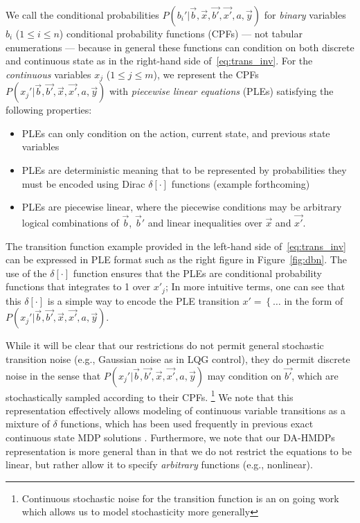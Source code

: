 \documentclass[twoside,11pt]{article}
\begin{document}
We call the conditional probabilities
$P(b_i'|\vec{b},\vec{x},\vec{b'},\vec{x'},a,\vec{y})$ for \emph{binary} variables $b_i$
($1 \leq i \leq n$) conditional probability functions (CPFs) --- not
tabular enumerations --- because in general these functions can
condition on both discrete and continuous state as
in the right-hand side of~\eqref{eq:trans_inv}.  For the \emph{continuous} variables
$x_j$ ($1 \leq j \leq m$), we represent the CPFs
$P(x_j'|\vec{b},\vec{b'},\vec{x},\vec{x'},a,\vec{y})$ with \emph{piecewise
linear equations} (PLEs) satisfying the following properties: 
\begin{itemize}
\item PLEs can only condition on the action, current state, and previous state variables
\item PLEs are deterministic meaning that to be represented by probabilities they
must be encoded using Dirac $\delta[\cdot]$ functions (example forthcoming)
\item PLEs are piecewise linear, where the piecewise conditions may be arbitrary logical combinations of $\vec{b}$, $\vec{b}'$ 
and linear inequalities over $\vec{x}$ and $\vec{x'}$.  
\end{itemize}

The transition function example provided in the left-hand side of~\eqref{eq:trans_inv} can be expressed in PLE format such as the right figure in Figure~\ref{fig:dbn}.
The use of the $\delta[\cdot]$ function ensures that the PLEs are conditional
probability functions that integrates to 1 over $x'_j$; In more intuitive
terms, one can see that this $\delta[\cdot]$ is a simple way to encode
the PLE transition $x' = \left\{ \ldots \right.$ in the form of 
$P(x_j'|\vec{b},\vec{b'},\vec{x},\vec{x'},a,\vec{y})$.

While it will be clear that our restrictions do not permit general stochastic transition noise (e.g., Gaussian noise as in LQG control), they do permit discrete noise in the sense that
$P(x_j'|\vec{b},\vec{b'},\vec{x},\vec{x'},a,\vec{y})$ may condition on
$\vec{b'}$, which are stochastically sampled according to their CPFs.
\footnote{Continuous stochastic noise for the transition function is an on going work which allows us to model stochasticity more generally}
We note that this representation effectively allows modeling of
continuous variable transitions as a mixture of $\delta$ functions,
which has been used frequently in previous exact continuous state MDP
solutions \cite{feng04,hao09}.
Furthermore, we note that our
DA-HMDPs representation is more general than \cite{feng04,li05,hao09} in that
we do not restrict the equations to be linear, but rather
allow it to specify \emph{arbitrary} functions (e.g., nonlinear). 
\end{document}
